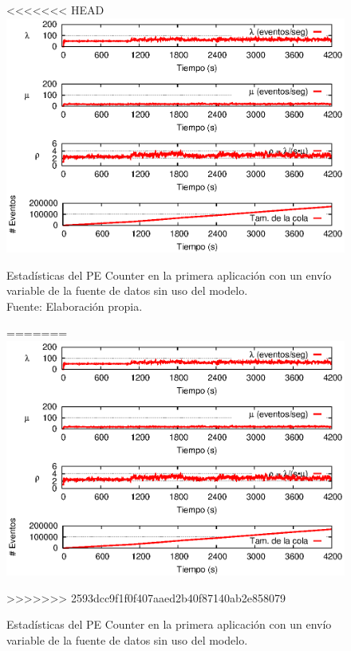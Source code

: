 \begin{figure}[!ht]
<<<<<<< HEAD
    \centering
    \captionsetup{justification=centering}
    \includegraphics[scale=1]{images/exp/app1/normal/sm/statusCounterPE.eps}
    \caption[Estadísticas del PE Counter en la primera aplicación con un envío variable de la fuente de datos sin uso del modelo.]{Estadísticas del PE Counter en la primera aplicación con un envío variable de la fuente de datos sin uso del modelo.\\Fuente: Elaboración propia.}
=======
\centering
    \includegraphics[scale=1.1]{images/exp/app1/normal/sm/statusCounterPE.eps}
    \caption{Estad\'isticas del PE Counter en la primera aplicaci\'on con un env\'io variable de la fuente de datos sin uso del modelo.}
>>>>>>> 2593dcc9f1f0f407aaed2b40f87140ab2e858079
    \label{fig:app1-normal-statusCounterPE-sm}
\end{figure}

